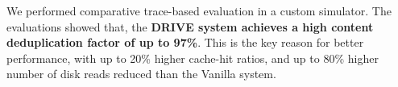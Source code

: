 We performed comparative trace-based evaluation in a custom simulator.
The evaluations showed that,
the \textbf{DRIVE system achieves a high content deduplication factor of up to 97\%}.
This is the key reason for better performance, with
up to 20\% higher cache-hit ratios,
and up to 80\% higher number of disk reads reduced than the Vanilla system.

